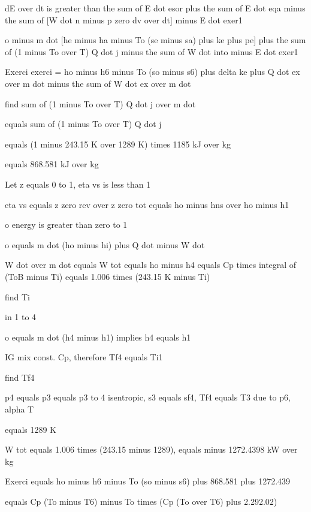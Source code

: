 dE over dt is greater than the sum of E dot esor plus the sum of E dot eqa minus the sum of [W dot n minus p zero dv over dt] minus E dot exer1

o minus m dot [he minus ha minus To (se minus sa) plus ke plus pe] plus the sum of (1 minus To over T) Q dot j minus the sum of W dot into minus E dot exer1

Exerci exerci = ho minus h6 minus To (so minus s6) plus delta ke plus Q dot ex over m dot minus the sum of W dot ex over m dot

find sum of (1 minus To over T) Q dot j over m dot

equals sum of (1 minus To over T) Q dot j

equals (1 minus 243.15 K over 1289 K) times 1185 kJ over kg

equals 868.581 kJ over kg

Let z equals 0 to 1, eta vs is less than 1

eta vs equals z zero rev over z zero tot equals ho minus hns over ho minus h1

o energy is greater than zero to 1

o equals m dot (ho minus hi) plus Q dot minus W dot

W dot over m dot equals W tot equals ho minus h4 equals Cp times integral of (ToB minus Ti) equals 1.006 times (243.15 K minus Ti)

find Ti

in 1 to 4

o equals m dot (h4 minus h1) implies h4 equals h1

IG mix const. Cp, therefore Tf4 equals Ti1

find Tf4

p4 equals p3 equals p3 to 4 isentropic, s3 equals sf4, Tf4 equals T3 due to p6, alpha T

equals 1289 K

W tot equals 1.006 times (243.15 minus 1289), equals minus 1272.4398 kW over kg

Exerci equals ho minus h6 minus To (so minus s6) plus 868.581 plus 1272.439

equals Cp (To minus T6) minus To times (Cp (To over T6) plus 2.292.02)